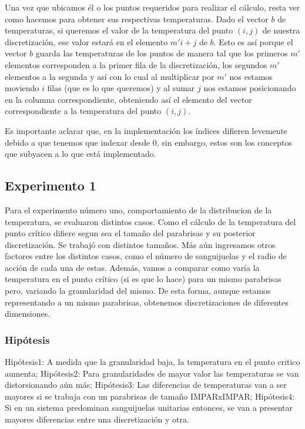 Una vez que ubicamos él o los puntos requeridos para realizar el cálculo, resta ver como hacemos para obtener sus respectivas temperaturas. Dado el vector $b$ de temperaturas, si queremos el valor de la temperatura del punto $(i, j)$ de nuestra discretización, ese valor estará en el elemento $m'i + j$ de $b$. Esto es así porque el vector $b$ guarda las temperaturas de los puntos de manera tal que los primeros $m'$ elementos corresponden a la primer fila de la discretización, los segundos $m'$ elementos a la segunda y así con lo cual al multiplicar por $m'$ nos estamos moviendo $i$ filas (que es lo que queremos) y al sumar $j$ nos estamos posicionando en la columna correspondiente, obteniendo así el elemento del vector correspondiente a la temperatura del punto $(i, j)$.
\par Es importante aclarar que, en la implementación los índices difieren levemente debido a que tenemos que indexar desde 0, sin embargo, estos son los conceptos que subyacen a lo que está implementado.

\subsection{Experimento 1}

Para el experimento número uno, comportamiento de la distribucion de la temperatura, se evaluaron distintos casos. Como el cálculo de la temperatura del punto crítico difiere segun sea el tamaño del parabrisas y su posterior discretización. Se trabajó con distintos tamaños. Más aún ingresamos otros factores entre los distintos casos, como el número de sanguijuelas y  el radio de acción de cada una de estas. Además, vamos a comparar como varía la temperatura en el punto crítico (si es que lo hace) para un mismo parabrisas pero, variando la granularidad del mismo. De esta forma, aunque estamos representando a un mismo parabrisas, obtenemos discretizaciones de diferentes dimensiones.        

\subsubsection{Hipótesis}

Hipótesis1: A medida que la granularidad baja, la temperatura en el punto critico aumenta;\newline
Hipótesis2: Para granularidades de mayor valor las temperaturas se van distorsionando aún más;\newline
Hipótesis3: Las diferencias de temperaturas van a ser mayores si se trabaja con un parabrisas de tamaño IMPARxIMPAR;\newline
Hipótesis4: Si en un sistema predominan sanguijuelas unitarias entonces, se van a presentar mayores diferencias entre una discretización y otra.\newline





